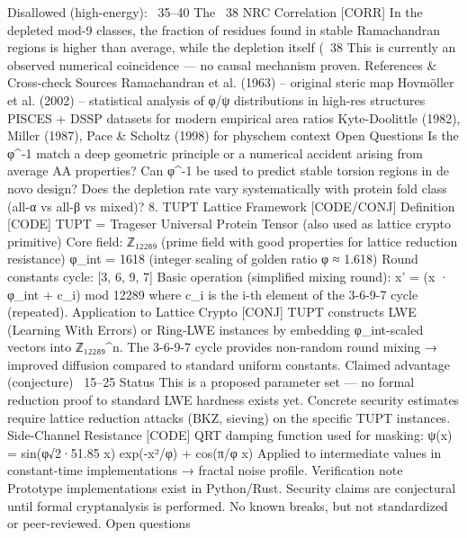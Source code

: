 {{{{{{Disallowed (high-energy): ~35–40%
The ~38%
NRC Correlation [CORR]
In the depleted mod-9 classes, the fraction of residues found in stable Ramachandran regions is higher than average, while the depletion itself (~38%
This is currently an observed numerical coincidence — no causal mechanism proven.
References & Cross-check Sources
Ramachandran et al. (1963) – original steric map
Hovmöller et al. (2002) – statistical analysis of φ/ψ distributions in high-res structures
PISCES + DSSP datasets for modern empirical area ratios
Kyte-Doolittle (1982), Miller (1987), Pace & Scholtz (1998) for physchem context
Open Questions
Is the φ^{-1} match a deep geometric principle or a numerical accident arising from average AA properties?
Can φ^{-1} be used to predict stable torsion regions in de novo design?
Does the depletion rate vary systematically with protein fold class (all-α vs all-β vs mixed)?
8. TUPT Lattice Framework [CODE/CONJ]
Definition [CODE]
TUPT = Trageser Universal Protein Tensor (also used as lattice crypto primitive)
Core field: ℤ₁₂₂₈₉ (prime field with good properties for lattice reduction resistance)
φ_int = 1618 (integer scaling of golden ratio φ ≈ 1.618)
Round constants cycle: [3, 6, 9, 7]
Basic operation (simplified mixing round):
x' = (x · φ_int + c_i) mod 12289
where c_i is the i-th element of the 3-6-9-7 cycle (repeated).
Application to Lattice Crypto [CONJ]
TUPT constructs LWE (Learning With Errors) or Ring-LWE instances by embedding φ_int-scaled vectors into ℤ₁₂₂₈₉^n.
The 3-6-9-7 cycle provides non-random round mixing → improved diffusion compared to standard uniform constants.
Claimed advantage (conjecture)
~15–25%
Status
This is a proposed parameter set — no formal reduction proof to standard LWE hardness exists yet.
Concrete security estimates require lattice reduction attacks (BKZ, sieving) on the specific TUPT instances.
Side-Channel Resistance [CODE]
QRT damping function used for masking:
ψ(x) = sin(φ√2·51.85 x) exp(-x²/φ) + cos(π/φ x)
Applied to intermediate values in constant-time implementations → fractal noise profile.
Verification note
Prototype implementations exist in Python/Rust.
Security claims are conjectural until formal cryptanalysis is performed.
No known breaks, but not standardized or peer-reviewed.
Open questions
}}}}}}
